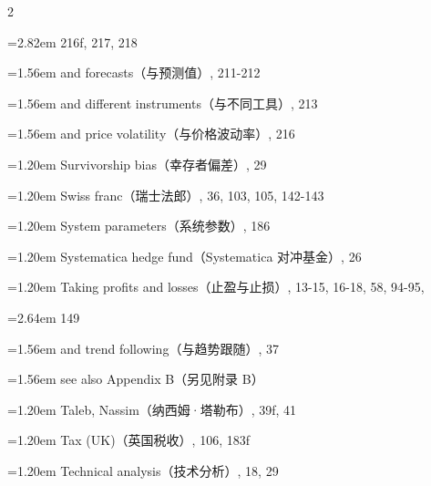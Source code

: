{\begin{multicols}{2}
\par \noindent\hangindent=2.82em\hspace*{1.62em} 216f, 217, 218
\par \noindent\hangindent=1.56em\hspace*{0.36em} and forecasts（与预测值）, 211-212
\par \noindent\hangindent=1.56em\hspace*{0.36em} and different instruments（与不同工具）, 213
\par \noindent\hangindent=1.56em\hspace*{0.36em} and price volatility（与价格波动率）, 216
\par \noindent\hangindent=1.20em\hspace*{0.00em} Survivorship bias（幸存者偏差）, 29
\par \noindent\hangindent=1.20em\hspace*{0.00em} Swiss franc（瑞士法郎）, 36, 103, 105, 142-143
\par \noindent\hangindent=1.20em\hspace*{0.00em} System parameters（系统参数）, 186
\par \noindent\hangindent=1.20em\hspace*{0.00em} Systematica hedge fund（Systematica 对冲基金）, 26
\par \noindent\hangindent=1.20em\hspace*{0.00em} Taking profits and losses（止盈与止损）, 13-15, 16-18, 58, 94-95,
\par \noindent\hangindent=2.64em\hspace*{1.44em} 149
\par \noindent\hangindent=1.56em\hspace*{0.36em} and trend following（与趋势跟随）, 37
\par \noindent\hangindent=1.56em\hspace*{0.36em} see also Appendix B（另见附录 B）
\par \noindent\hangindent=1.20em\hspace*{0.00em} Taleb, Nassim（纳西姆·塔勒布）, 39f, 41
\par \noindent\hangindent=1.20em\hspace*{0.00em} Tax (UK)（英国税收）, 106, 183f
\par \noindent\hangindent=1.20em\hspace*{0.00em} Technical analysis（技术分析）, 18, 29

\end{multicols}}
